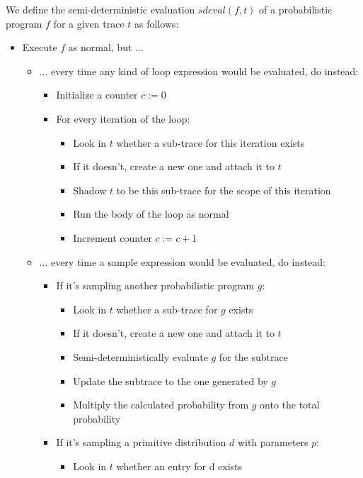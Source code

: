 We define the semi-deterministic evaluation $sdeval(f,t)$ of a probabilistic program $f$ for a given trace $t$ as follows:

\begin{minipage}{\linewidth}
\begin{itemize}
\item Execute $f$ as normal, but ...
  \begin{itemize}
  \item ... every time any kind of loop expression would be evaluated, do instead:
    \begin{itemize}
    \item Initialize a counter $c := 0$
    \item For every iteration of the loop:
      \begin{itemize}
      \item Look in $t$ whether a sub-trace for this iteration exists
      \item If it doesn't, create a new one and attach it to $t$
      \item Shadow $t$ to be this sub-trace for the scope of this iteration
      \item Run the body of the loop as normal
      \item Increment counter $c := c + 1$
      \end{itemize}
    \end{itemize}
  \item ... every time a sample expression would be evaluated, do instead:
    \begin{itemize}
    \item If it's sampling another probabilistic program $g$:
      \begin{itemize}
      \item Look in $t$ whether a sub-trace for $g$ exists
      \item If it doesn't, create a new one and attach it to $t$
      \item Semi-deterministically evaluate $g$ for the subtrace
      \item Update the subtrace to the one generated by $g$
      \item Multiply the calculated probability from $g$ onto the total probability
      \end{itemize}
    \item If it's sampling a primitive distribution $d$ with parameters $p$:
      \begin{itemize}
      \item Look in $t$ whether an entry for d exists

\end{itemize}
\end{itemize}
\end{itemize}
\end{itemize}
\end{minipage}
